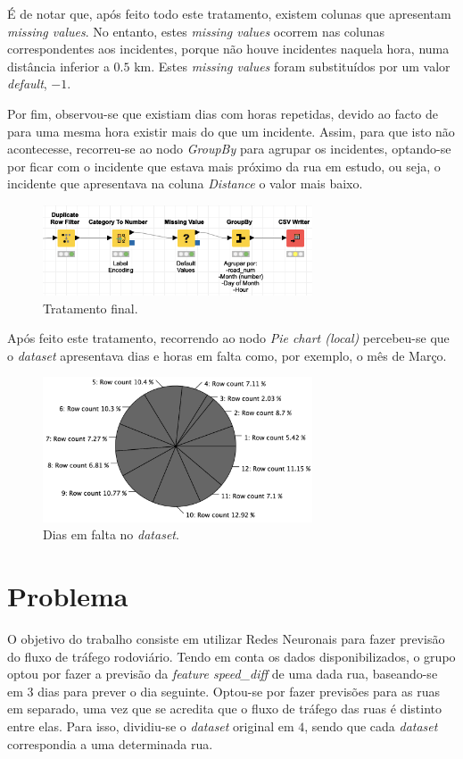 \documentclass[a4paper, 12pt]{article}
\begin{document}
É de notar que, após feito todo este tratamento, existem colunas que apresentam \textit{missing values}. No entanto, estes \textit{missing values} ocorrem nas colunas correspondentes aos incidentes, porque não houve incidentes naquela hora, numa distância inferior a $0.5$ km. Estes \textit{missing values} foram substituídos por um valor \textit{default}, $-1$.

Por fim, observou-se que existiam dias com horas repetidas, devido ao facto de para uma mesma hora existir mais do que um incidente. Assim, para que isto não acontecesse, recorreu-se ao nodo \textit{GroupBy} para agrupar os incidentes, optando-se por ficar com o incidente que estava mais próximo da rua em estudo, ou seja, o incidente que apresentava na coluna \textit{Distance} o valor mais baixo.

\begin{figure}[H]
	\centering
	\includegraphics[width=8cm]{fim}
	\caption{Tratamento final.}
\end{figure}

Após feito este tratamento, recorrendo ao nodo \textit{Pie chart (local)} percebeu-se que o \textit{dataset} apresentava dias e horas em falta como, por exemplo, o mês de Março.

\begin{figure}[H]
	\centering
	\includegraphics[width=8cm]{mes_dias}
	\caption{Dias em falta no \textit{dataset}.}
\end{figure}

\section{Problema}

O objetivo do trabalho consiste em utilizar Redes Neuronais para fazer previsão do fluxo de tráfego rodoviário. Tendo em conta os dados disponibilizados, o grupo optou por fazer a previsão da \textit{feature speed\_diff} de uma dada rua, baseando-se em 3 dias para prever o dia seguinte. Optou-se por fazer previsões para as ruas em separado, uma vez que se acredita que o fluxo de tráfego das ruas é distinto entre elas. Para isso, dividiu-se o \textit{dataset} original em $4$, sendo que cada \textit{dataset} correspondia a uma determinada rua.
\end{document}
